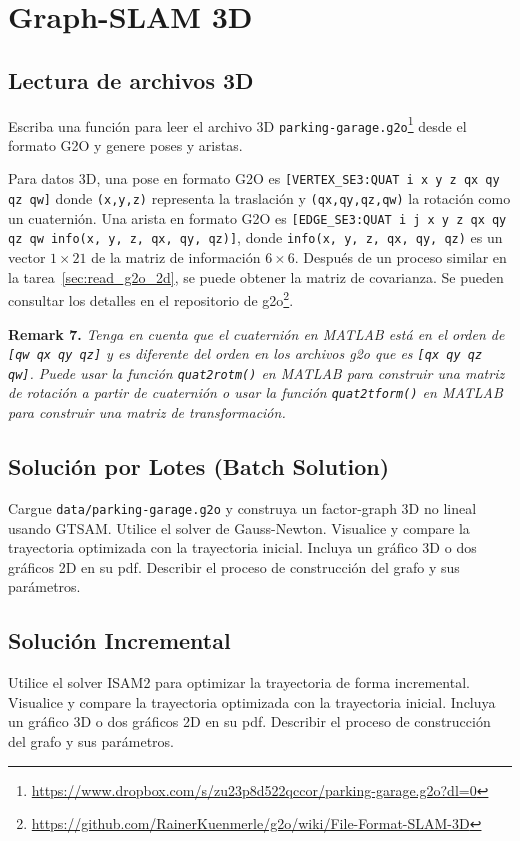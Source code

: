 \documentclass[tp]{lcc}
\begin{document}
\section{Graph-SLAM 3D}
\subsection{Lectura de archivos 3D}
Escriba una función para leer el archivo 3D \lstinline[style=bash]{parking-garage.g2o}\footnote{\url{https://www.dropbox.com/s/zu23p8d522qccor/parking-garage.g2o?dl=0}} desde el formato G2O y genere poses y aristas.

Para datos 3D, una pose en formato G2O es \lstinline[style=bash]{[VERTEX_SE3:QUAT i x y z qx qy qz qw]} donde \lstinline[style=bash]{(x,y,z)} representa la traslación y \lstinline[style=bash]{(qx,qy,qz,qw)} la rotación como un cuaternión. Una arista en formato G2O es \lstinline[style=bash]{[EDGE_SE3:QUAT i j x y z qx qy qz qw info(x, y, z, qx, qy, qz)]}, donde \lstinline[style=bash]{info(x, y, z, qx, qy, qz)} es un vector $1 \times 21$ de la matriz de información $6 \times 6$. Después de un proceso similar en la tarea~\ref{sec:read_g2o_2d}, se puede obtener la matriz de covarianza. Se pueden consultar los detalles en el repositorio de g2o\footnote{\url{https://github.com/RainerKuenmerle/g2o/wiki/File-Format-SLAM-3D}}.

\textbf{Remark 7.} \textit{Tenga en cuenta que el cuaternión en MATLAB está en el orden de \lstinline[style=bash]{[qw qx qy qz]} y es diferente del orden en los archivos g2o que es \lstinline[style=bash]{[qx qy qz qw]}. Puede usar la función \lstinline[style=bash]{quat2rotm()} en MATLAB para construir una matriz de rotación a partir de cuaternión o usar la función \lstinline[style=bash]{quat2tform()} en MATLAB para construir una matriz de transformación.}

\subsection{Solución por Lotes (Batch Solution)}
Cargue \lstinline[style=bash]{data/parking-garage.g2o} y construya un factor-graph 3D no lineal usando GTSAM. Utilice el solver de Gauss-Newton. Visualice y compare la trayectoria optimizada con la trayectoria inicial. Incluya un gráfico 3D o dos gráficos 2D en su pdf. Describir el proceso de construcción del grafo y sus parámetros.

\subsection{Solución Incremental}
Utilice el solver ISAM2 para optimizar la trayectoria de forma incremental. Visualice y compare la trayectoria optimizada con la trayectoria inicial. Incluya un gráfico 3D o dos gráficos 2D en su pdf. Describir el proceso de construcción del grafo y sus parámetros.
\end{document}
